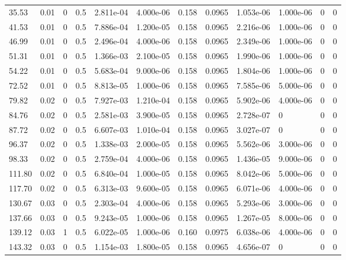 \documentclass[preview]{standalone}
\begin{document}
{{\begin{tabular}{L{1.2cm}C{1.2cm} C{0.3cm}C{0.5cm} C{1.4cm}C{1.4cm} C{1.4cm}C{1.4cm} C{1.6cm}C{1.6cm} C{1.6cm}C{1.6cm}}
  35.53  &  0.01  & 0     & 0.5 &  2.811e-04  & 4.000e-06  &  0.158&   0.0965& 1.053e-06 & 1.000e-06   &  0 & 0  \\ 
  41.53  &  0.01  & 0     & 0.5 &  7.886e-04  & 1.200e-05  &  0.158&   0.0965& 2.216e-06 & 1.000e-06   &  0 & 0  \\ 
  46.99  &  0.01  & 0     & 0.5 &  2.496e-04  & 4.000e-06  &  0.158&   0.0965& 2.349e-06 & 1.000e-06   &  0 & 0  \\ 
  51.31  &  0.01  & 0     & 0.5 &  1.366e-03  & 2.100e-05  &  0.158&   0.0965& 1.990e-06 & 1.000e-06   &  0 & 0  \\ 
  54.22  &  0.01  & 0     & 0.5 &  5.683e-04  & 9.000e-06  &  0.158&   0.0965& 1.804e-06 & 1.000e-06   &  0 & 0  \\ 
  72.52  &  0.01  & 0     & 0.5 &  8.813e-05  & 1.000e-06  &  0.158&   0.0965& 7.585e-06 & 5.000e-06   &  0 & 0  \\ 
  79.82  &  0.02  & 0     & 0.5 &  7.927e-03  & 1.210e-04  &  0.158&   0.0965& 5.902e-06 & 4.000e-06   &  0 & 0  \\ 
  84.76  &  0.02  & 0     & 0.5 &  2.581e-03  & 3.900e-05  &  0.158&   0.0965& 2.728e-07 & 0   &  0 & 0  \\ 
  87.72  &  0.02  & 0     & 0.5 &  6.607e-03  & 1.010e-04  &  0.158&   0.0965& 3.027e-07 & 0   &  0 & 0  \\ 
  96.37  &  0.02  & 0     & 0.5 &  1.338e-03  & 2.000e-05  &  0.158&   0.0965& 5.562e-06 & 3.000e-06   &  0 & 0  \\ 
  98.33  &  0.02  & 0     & 0.5 &  2.759e-04  & 4.000e-06  &  0.158&   0.0965& 1.436e-05 & 9.000e-06   &  0 & 0  \\ 
  111.80  &  0.02  & 0     & 0.5 &  6.840e-04  & 1.000e-05  &  0.158&   0.0965& 8.042e-06 & 5.000e-06   &  0 & 0  \\ 
  117.70  &  0.02  & 0     & 0.5 &  6.313e-03  & 9.600e-05  &  0.158&   0.0965& 6.071e-06 & 4.000e-06   &  0 & 0  \\ 
  130.67  &  0.03  & 0     & 0.5 &  2.303e-04  & 4.000e-06  &  0.158&   0.0965& 5.293e-06 & 3.000e-06   &  0 & 0  \\ 
  137.66  &  0.03  & 0     & 0.5 &  9.243e-05  & 1.000e-06  &  0.158&   0.0965& 1.267e-05 & 8.000e-06   &  0 & 0  \\ 
  139.12  &  0.03  & 1     & 0.5 &  6.022e-05  & 1.000e-06  &  0.160&   0.0975& 6.038e-06 & 4.000e-06   &  0 & 0  \\ 
  143.32  &  0.03  & 0     & 0.5 &  1.154e-03  & 1.800e-05  &  0.158&   0.0965& 4.656e-07 & 0   &  0 & 0  \\ 

\end{tabular}}}
\end{document}
